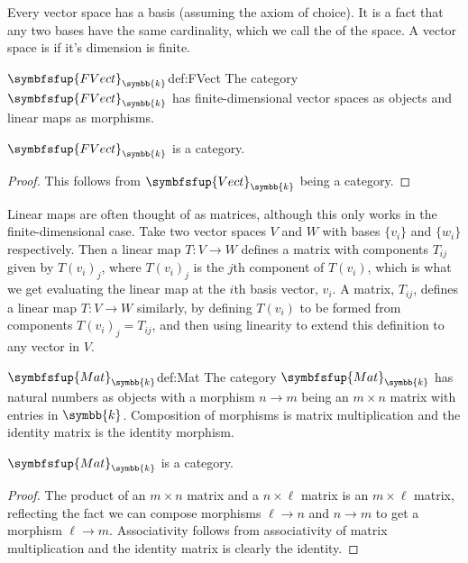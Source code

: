 \documentclass[fleqn]{NotesClass}
\makeatletter
\newcommand{\c@egory}[1]{\symbfsfup{#1}}
\renewcommand{\field}{\symbb{k}}
\newcommand{\Mat}[1][\field]{{\c@egory{Mat}_{#1}}}
\newcommand{\Vect}[1][\field]{{\c@egory{Vect}_{#1}}}
\newcommand{\FVect}[1][\field]{{\c@egory{FVect}_{#1}}}
\makeatother
\begin{document}
    Every vector space has a basis (assuming the axiom of choice).
    It is a fact that any two bases have the same cardinality, which we call the  of the space.
    A vector space is  if it's dimension is finite.
    
    \begin{dfn}{\normalsize\(\FVect\)}{def:FVect}
        The category \(\FVect\) has finite-dimensional vector spaces as objects and linear maps as morphisms.
    \end{dfn}
    
    \begin{lma}{}{}
        \(\FVect\) is a category.
        \begin{proof}
            This follows from \(\Vect\) being a category.
        \end{proof}
    \end{lma}
    
    Linear maps are often thought of as matrices, although this only works in the finite-dimensional case.
    Take two vector spaces \(V\) and \(W\) with bases \(\{v_i\}\) and \(\{w_i\}\) respectively.
    Then a linear map \(T \colon V \to W\) defines a matrix with components \(T_{ij}\) given by \(T(v_i)_j\), where \(T(v_i)_j\) is the \(j\)th component of \(T(v_i)\), which is what we get evaluating the linear map at the \(i\)th basis vector, \(v_i\).
    A matrix, \(T_{ij}\), defines a linear map \(T \colon V \to W\) similarly, by defining \(T(v_i)\) to be formed from components \(T(v_i)_j = T_{ij}\), and then using linearity to extend this definition to any vector in \(V\).
    
    \begin{dfn}{\normalsize\(\Mat\)}{def:Mat}
        The category \(\Mat\)\index{Mat@\(\Mat\)} has natural numbers as objects with a morphism \(n \to m\) being an \(m \times n\) matrix with entries in \(\field\).
        Composition of morphisms is matrix multiplication and the identity matrix is the identity morphism.
    \end{dfn}
    
    \begin{lma}{}{}
        \(\Mat\) is a category.
        \begin{proof}
            The product of an \(m \times n\) matrix and a \(n \times \ell\) matrix is an \(m \times \ell\) matrix, reflecting the fact we can compose morphisms \(\ell \to n\) and \(n \to m\) to get a morphism \(\ell \to m\).
            Associativity follows from associativity of matrix multiplication and the identity matrix is clearly the identity.
        \end{proof}
    \end{lma}
    
\end{document}
